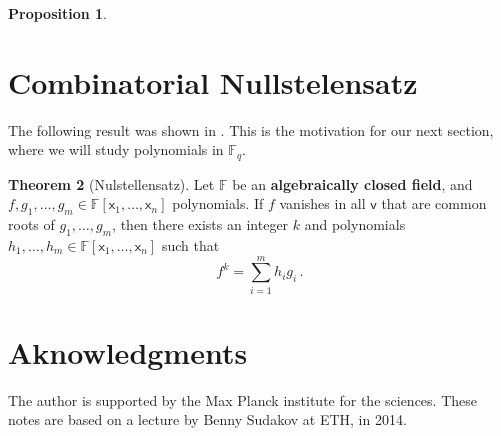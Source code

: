 \documentclass[12pt]{amsart}
\theoremstyle{definition}
\newtheorem{thm}{Theorem}[section]
\newtheorem{prop}[thm]{Proposition}
\newcommand{\F}{\mathbb{F}}
\newcommand{\vv}{\mathsf{v}}
\newcommand{\vx}{\mathsf{x}}
\begin{document}
\begin{prop}

\end{prop}








\section{Combinatorial Nullstelensatz}


The following result was shown in \cite{hilbert1893ueber}.
This is the motivation for our next section, where we will study polynomials in $\F_q$.

\begin{thm}[Nulstellensatz]
Let $\F$ be an \textbf{algebraically closed field}, and $f, g_1, \ldots, g_m\in \F[\vx_1, \ldots, \vx_n]$ polynomials.
If $f$ vanishes in all $\vv$ that are common roots of $g_1, \ldots, g_m$, then there exists an integer $k$ and polynomials $h_1, \ldots, h_m \in \F[\vx_1, \ldots, \vx_n]$ such that
$$ f^k = \sum_{i=1}^m h_i g_i \, . $$
\end{thm}




\section*{Aknowledgments}
The author is supported by the Max Planck institute for the sciences. 
These notes are based on a lecture by Benny Sudakov at ETH, in 2014.



\end{document}
